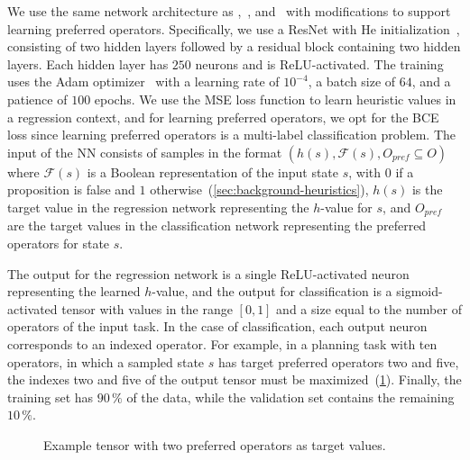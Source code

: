 \documentclass[ppgc,diss,english]{iiufrgs}
\begin{document}
We use the same network architecture as \citet{Ferber.etal/2022},~\citet{OToole/2022}, and~\citet{Bettker.etal/2022} with modifications to support learning preferred operators. Specifically, we use a ResNet with He initialization~\cite{He.etal/2015}, consisting of two hidden layers followed by a residual block containing two hidden layers.
Each hidden layer has $250$ neurons and is ReLU-activated.
The training uses the Adam optimizer~\cite{Kingma.Ba/2015} with a learning rate of $10^{-4}$, a batch size of $64$, and a patience of $100$ epochs.
We use the MSE loss function to learn heuristic values in a regression context, and for learning preferred operators, we opt for the BCE loss since learning preferred operators is a multi-label classification problem.
The input of the NN consists of samples in the format $(h(s), \mathcal{F}(s), O_{pref} \subseteq O)$
where $\mathcal{F}(s)$ is a Boolean representation of the input state $s$, with $0$ if a proposition is false and $1$ otherwise~(\cref{sec:background-heuristics}), $h(s)$ is the target value in the regression network representing the $h$-value for $s$, and $O_{pref}$ are the target values in the classification network representing the preferred operators for state $s$.

The output for the regression network is a single ReLU-activated neuron representing the learned $h$-value, and the output for classification is a sigmoid-activated tensor with values in the range $[0, 1]$ and a size equal to the number of operators of the input task.
In the case of classification, each output neuron corresponds to an indexed operator. For example, in a planning task with ten operators, in which a sampled state $s$ has target preferred operators two and five, the indexes two and five of the output tensor must be maximized~(\cref{fig:po-tensor}). Finally, the training set has $90\,\%$ of the data, while the validation set contains the remaining $10\,\%$.

\begin{figure}[tb]
\caption[]{Example tensor with two preferred operators as target values.}
\vspace{\baselineskip}
\centering
{}
\label{fig:po-tensor}
\end{figure}
\end{document}
